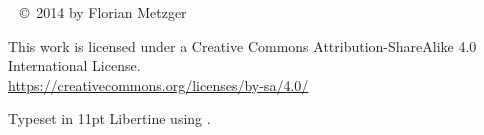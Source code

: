 \newpage
\thispagestyle{empty}
~\vfill
\noindent\copyright~2014 by Florian Metzger

\vspace{5mm}

\noindent This work is licensed under a Creative Commons Attribution-ShareAlike 4.0 International License.\\
\url{https://creativecommons.org/licenses/by-sa/4.0/}

\vspace{5mm}

\noindent\ccbysa

\vspace{5mm}
\noindent Typeset in 11pt Libertine using \LuaLaTeX.
